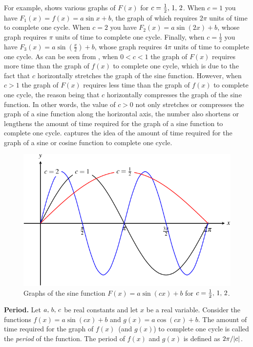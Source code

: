 \documentclass[a4paper,oneside,12pt]{article}
\begin{document}
For example,  shows various
graphs of $F(x)$ for $c = {\frac{1}{2}},\, {1},\, {2}$.  When $c = 1$
you have $F_1(x) = f(x) = a \sin x + b$, the graph of which requires
$2\pi$ units of time to complete one cycle.  When $c = 2$ you have
$F_2(x) = a \sin(2x) + b$, whose graph requires $\pi$ units of time to
complete one cycle.  Finally, when $c = \frac{1}{2}$ you have
$F_3(x) = a \sin(\frac{x}{2}) + b$, whose graph requires $4\pi$ units
of time to complete one cycle.  As can be seen from
, when $0 < c < 1$ the graph of
$F(x)$ requires more time than the graph of $f(x)$ to complete one
cycle, which is due to the fact that $c$ horizontally stretches the
graph of the sine function.  However, when $c > 1$ the graph of $F(x)$
requires less time than the graph of $f(x)$ to complete one cycle, the
reason being that $c$ horizontally compresses the graph of the sine
function.  In other words, the value of $c > 0$ not only stretches or
compresses the graph of a sine function along the horizontal axis, the
number also shortens or lengthens the amount of time required for the
graph of a sine function to complete one cycle.
 captures the idea of
the amount of time required for the graph of a sine or cosine function
to complete one cycle.

\begin{figure}[!htbp]
\centering
\includegraphics[scale=1.1]{image/13/sin-cycle.pdf}
\caption{%
  Graphs of the sine function $F(x) = a \sin(cx) + b$ for
  $c = {\frac{1}{2}},\, {1},\, {2}$.
}
\label{fig:trigonometric:sine_cycle}
\end{figure}

\begin{definition}
\label{def:trigonometric:sine_cosine_period}
\textbf{Period.}
Let ${a},\, {b},\, {c}$ be real constants and let $x$ be a real
variable.  Consider the functions $f(x) = a \sin(cx) + b$ and
$g(x) = a \cos(cx) + b$.  The amount of time required for the graph
of $f(x)$~(and $g(x)$) to complete one cycle is called the
\emph{period} of the function.  The period of $f(x)$ and $g(x)$ is
defined as $2\pi / \lvert c\rvert$.
\end{definition}
\end{document}
